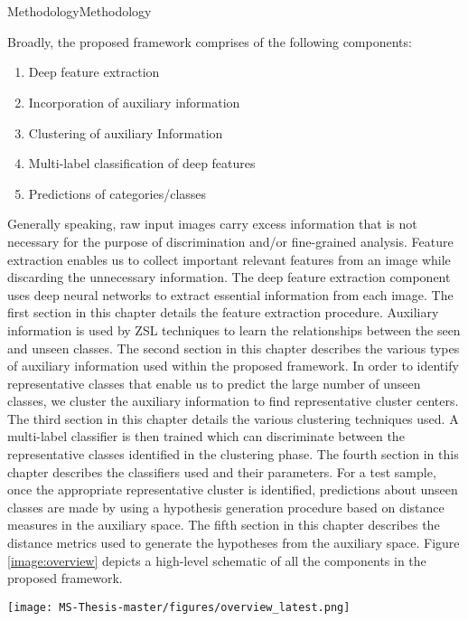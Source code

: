 \chapter{}{{Methodology}}{Methodology}

Broadly, the proposed framework comprises of the following components:
\begin{enumerate}
    \item Deep feature extraction
    \item Incorporation of auxiliary information
    \item Clustering of auxiliary Information
    \item Multi-label classification of deep features
    \item Predictions of categories/classes
\end{enumerate}

Generally speaking, raw input images carry excess information that is not necessary for the purpose of discrimination and/or fine-grained analysis. Feature extraction enables us to collect important relevant features from an image while discarding the unnecessary information. The deep feature extraction component uses deep neural networks to extract essential information from each image. The first section in this chapter details the feature extraction procedure. Auxiliary information is used by ZSL techniques to learn the relationships between the seen and unseen classes. The second section in this chapter describes the various types of auxiliary information used within the proposed framework. In order to identify representative classes that enable us to predict the large number of unseen classes, we cluster the auxiliary information to find representative cluster centers. The third section in this chapter details the various clustering techniques used. A multi-label classifier is then trained which can discriminate between the representative classes identified in the clustering phase. The fourth section in this chapter describes the classifiers used and their parameters. For a test sample, once the appropriate representative cluster is identified, predictions about unseen classes are made by using a hypothesis generation procedure based on distance measures in the auxiliary space. The fifth section in this chapter describes the distance metrics used to generate the hypotheses from the auxiliary space. Figure \ref{image:overview} depicts a high-level schematic of all the components in the proposed framework.

\begin{sidewaysfigure}

\centering
\texttt{[image: MS-Thesis-master/figures/overview\_latest.png]}
\caption{High-level schematic of the proposed framework.}
\label{image:overview}
\end{sidewaysfigure}

